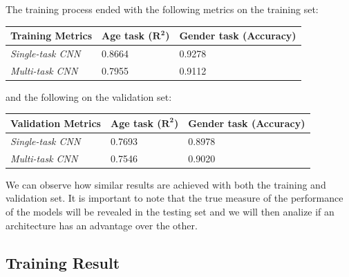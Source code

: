 The training process ended with the following metrics on the training set:
\begin{table}[H]
    \centering
    \begin{tabular}{@{}lll@{}}
    \toprule
    Training Metrics & \textbf{Age task ($\mathbf{R^2}$)} & \textbf{Gender task (Accuracy)} \\ \midrule
    \textit{Single-task CNN} & 0.8664            & 0.9278               \\
    \textit{Multi-task CNN}  & 0.7955            & 0.9112               \\ \bottomrule
    \end{tabular}
\end{table}
and the following on the validation set:
\begin{table}[H]
    \centering
    \begin{tabular}{@{}lll@{}}
    \toprule
    Validation Metrics & \textbf{Age task ($\mathbf{R^2}$)} & \textbf{Gender task (Accuracy)} \\ \midrule
    \textit{Single-task CNN} & 0.7693            & 0.8978               \\
    \textit{Multi-task CNN}  & 0.7546            & 0.9020               \\ \bottomrule
    \end{tabular}
\end{table}
We can observe how similar results are achieved with both the training
and validation set. It is important to note that the true measure
of the performance of the models will be revealed in the testing set
and we will then analize if an architecture has an advantage over the other.

\subsection{Training Result}

